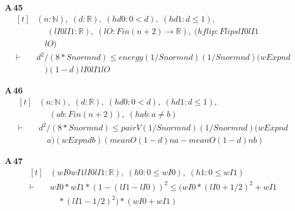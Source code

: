 \noindent\textbf{A\,45}\quad{}
{\footnotesize\[ \begin{aligned}[t]
&(\mathit{n} : \mathbb{N} ),\; (\mathit{d} : \mathbb{R} ),\; (\mathit{hd0} : 0 < \mathit{d}),\; (\mathit{hd1} : \mathit{d} \leq 1),\\
&\quad \; (\mathit{lI0} \mathit{lI1} : \mathbb{R} ),\; (\mathit{lO} : \mathit{Fin} (\mathit{n}+2) \to \mathbb{R} ),\; (\mathit{hflip} : \mathit{Flips} \mathit{lI0} \mathit{lI1}\\
&\quad \mathit{lO})\\
\vdash\;&\mathit{d}^{2}/(8*\mathit{Snorm} \mathit{n} \mathit{d}) \leq \mathit{energy} (1/\mathit{Snorm} \mathit{n} \mathit{d}) (1/\mathit{Snorm} \mathit{n} \mathit{d}) (\mathit{wExp} \mathit{n} \mathit{d}\\
&\quad ) (1-\mathit{d}) \mathit{lI0} \mathit{lI1} \mathit{lO}
\end{aligned} \]}

\noindent\textbf{A\,46}\quad{}
{\footnotesize\[ \begin{aligned}[t]
&(\mathit{n} : \mathbb{N} ),\; (\mathit{d} : \mathbb{R} ),\; (\mathit{hd0} : 0 < \mathit{d}),\; (\mathit{hd1} : \mathit{d} \leq 1),\\
&\quad \; (\mathit{a} \mathit{b} : \mathit{Fin} (\mathit{n}+2)),\; (\mathit{hab} : \mathit{a} \neq \mathit{b})\\
\vdash\;&\mathit{d}^{2}/(8*\mathit{Snorm} \mathit{n} \mathit{d}) \leq \mathit{pairV} (1/\mathit{Snorm} \mathit{n} \mathit{d}) (1/\mathit{Snorm} \mathit{n} \mathit{d}) (\mathit{wExp} \mathit{n} \mathit{d}\\
&\quad \mathit{a}) (\mathit{wExp} \mathit{n} \mathit{d} \mathit{b}) (\mathit{meanO} (1-\mathit{d}) \mathit{n} \mathit{a} - \mathit{meanO} (1-\mathit{d}) \mathit{n} \mathit{b})
\end{aligned} \]}

\noindent\textbf{A\,47}\quad{}
{\footnotesize\[ \begin{aligned}[t]
&(\mathit{wI0} \mathit{wI1} \mathit{lI0} \mathit{lI1} : \mathbb{R} ),\; (\mathit{h0} : 0 \leq \mathit{wI0}),\; (\mathit{h1} : 0 \leq \mathit{wI1})\\
\vdash\;&\mathit{wI0}*\mathit{wI1}*(1-(\mathit{lI1}-\mathit{lI0}))^{2} \leq (\mathit{wI0}*(\mathit{lI0}+1/2)^{2} + \mathit{wI1}\\
&\quad *(\mathit{lI1}-1/2)^{2})*(\mathit{wI0}+\mathit{wI1})
\end{aligned} \]}

